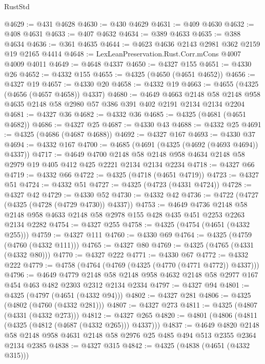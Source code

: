 \begin{lexlean}{RustStd}
\begin{coremodule}
@4629 := @431 @4628
@4630 := @430 @4629
@4631 := @409 @4630
@4632 := @408 @4631
@4633 := @407 @4632
@4634 := @389 @4633
@4635 := @388 @4634
@4636 := @361 @4635
@4644 := @4623 @4636 @2143 @2981 @362 @2159 @19 @2165 @4414
@4648 := LexLeanPreservation.Rust.Corr.mCons @4007 @4009 @4011
@4649 := @4648 @4337
@4650 := @4327 @155
@4651 := @4330 @26
@4652 := @4332 @155
@4655 := @4325 (@4650 (@4651 @4652))
@4656 := @4327 @19
@4657 := @4330 @20
@4658 := @4332 @19
@4663 := @4655 (@4325 (@4656 (@4657 @4658)) @4337)
@4680 := @4649
    @4663
    @2148
    @58
    @2148
    @958
    @4635
    @2148
    @58
    @2980
    @57
    @386
    @391
    @402
    @2191
    @2134
    @2134
    @2204
@4681 := @4327 @36
@4682 := @4332 @36
@4685 := @4325 (@4681 (@4651 @4682))
@4686 := @4327 @25
@4687 := @4330 @43
@4688 := @4332 @25
@4691 := @4325 (@4686 (@4687 @4688))
@4692 := @4327 @167
@4693 := @4330 @37
@4694 := @4332 @167
@4700 := @4685 (@4691 (@4325 (@4692 (@4693 @4694)) @4337))
@4717 := @4649
    @4700
    @2148
    @58
    @2148
    @958
    @4634
    @2148
    @58
    @2979
    @19
    @405
    @412
    @425
    @2221
    @2134
    @2134
    @2234
@4718 := @4327 @66
@4719 := @4332 @66
@4722 := @4325 (@4718 (@4651 @4719))
@4723 := @4327 @51
@4724 := @4332 @51
@4727 := @4325 (@4723 (@4331 @4724))
@4728 := @4327 @42
@4729 := @4330 @52
@4730 := @4332 @42
@4736 := @4722 (@4727 (@4325 (@4728 (@4729 @4730)) @4337))
@4753 := @4649
    @4736
    @2148
    @58
    @2148
    @958
    @4633
    @2148
    @58
    @2978
    @155
    @428
    @435
    @451
    @2253
    @2263
    @2134
    @2282
@4754 := @4327 @255
@4758 := @4325 (@4754 (@4651 (@4332 @255)))
@4759 := @4327 @111
@4760 := @4330 @69
@4764 := @4325 (@4759 (@4760 (@4332 @111)))
@4765 := @4327 @80
@4769 := @4325 (@4765 (@4331 (@4332 @80)))
@4770 := @4327 @222
@4771 := @4330 @67
@4772 := @4332 @222
@4779 := @4758 (@4764 (@4769 (@4325 (@4770 (@4771 @4772)) @4337)))
@4796 := @4649
    @4779
    @2148
    @58
    @2148
    @958
    @4632
    @2148
    @58
    @2977
    @167
    @454
    @463
    @482
    @2303
    @2312
    @2134
    @2334
@4797 := @4327 @94
@4801 := @4325 (@4797 (@4651 (@4332 @94)))
@4802 := @4327 @281
@4806 := @4325 (@4802 (@4760 (@4332 @281)))
@4807 := @4327 @273
@4811 := @4325 (@4807 (@4331 (@4332 @273)))
@4812 := @4327 @265
@4820 := @4801 (@4806 (@4811 (@4325 (@4812 (@4687 (@4332 @265))) @4337)))
@4837 := @4649
    @4820
    @2148
    @58
    @2148
    @958
    @4631
    @2148
    @58
    @2976
    @25
    @485
    @494
    @513
    @2355
    @2364
    @2134
    @2385
@4838 := @4327 @315
@4842 := @4325 (@4838 (@4651 (@4332 @315)))

\end{coremodule}
\end{lexlean}
